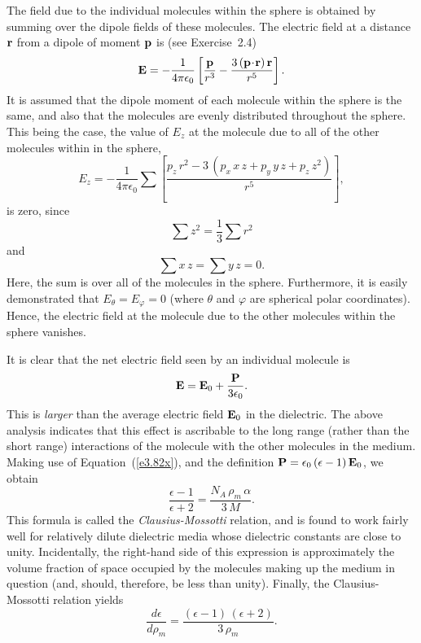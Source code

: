 The field due to the individual molecules within the sphere is
obtained by summing over the dipole fields of these molecules.
The electric field at a distance ${\bf r}$ from a dipole
of moment ${\bf p}$ is (see Exercise~2.4)
\begin{equation}
{\bf E} = -\frac{1}{4\pi\epsilon_0}\left[\frac{\bf p}{r^3}
- \frac{3\,({\bf p}\!\cdot\!{\bf r})\,{\bf r}}{r^5}\right].
\end{equation}
It is assumed that the dipole moment of each molecule within the
sphere is the same, and also that the molecules are evenly distributed
throughout the sphere. This being the case, the value
of $E_z$ at the molecule due to all of the other molecules
within in the sphere,
\begin{equation}
E_z = -\frac{1}{4\pi\epsilon_0}\sum\left[\frac{ p_z\,r^2
- 3\,(p_x\, x\,z + p_y\, y\,z + p_z\, z^2)}{r^5}\right],
\end{equation}
is zero, since
\begin{equation}
\sum z^2 = \frac{1}{3} \sum r^2
\end{equation}
and
\begin{equation}
\sum x\,z = \sum y\,z = 0.
\end{equation}
Here, the sum is over all of the molecules in the sphere.
Furthermore, it is easily demonstrated that $E_\theta = E_\varphi=0$ (where $\theta$ and $\varphi$ are spherical polar coordinates).
Hence, the electric field at the molecule due to the other molecules within
the sphere vanishes.
 
It is clear that the net electric field seen by an individual molecule is
\begin{equation}
{\bf E} = {\bf E}_0 + \frac{\bf P}{3\epsilon_0}.
\end{equation}
This is {\em larger} than the average electric field 
${\bf E}_0$ in the dielectric. The above  analysis indicates
that this effect is ascribable to the long range (rather than the short range)
interactions of the molecule with the other molecules in the medium. 
Making use of Equation~(\ref{e3.82x}), and the definition ${\bf P} =\epsilon_0\,
(\epsilon-1)\, {\bf E}_0$, we obtain
\begin{equation}
\frac{\epsilon -1}{\epsilon+2} = \frac{N_A\,\rho_m\, \alpha}{3 \,M}.
\end{equation}
This formula is called the {\em Clausius-Mossotti}\/ relation, and  is found
to work fairly well for relatively dilute dielectric media whose dielectric constants are close to unity. Incidentally, the right-hand side of this expression is approximately the volume
fraction of space occupied by the molecules making up the medium in question (and, should, therefore, be less than unity).
Finally, the Clausius-Mossotti relation yields
\begin{equation}\label{e5.93x}
\frac{d\epsilon}{d\rho_m} = \frac{(\epsilon-1)\,(\epsilon+2)}{3\,\rho_m}.
\end{equation}

